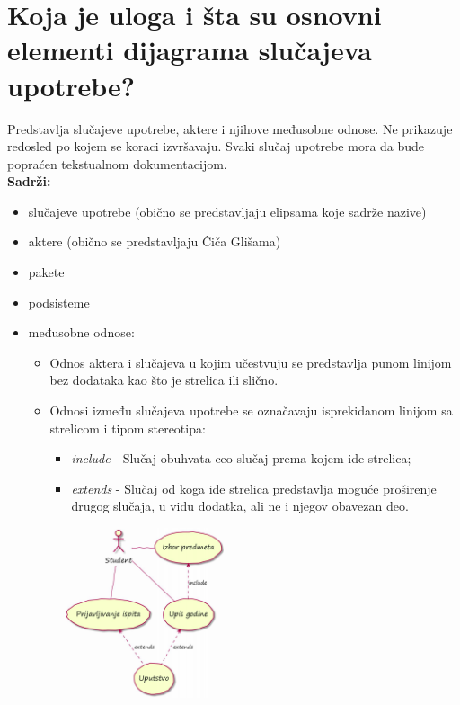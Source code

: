 \documentclass[a4paper]{article}
\begin{document}
\section{Koja je uloga i šta su osnovni elementi dijagrama slučajeva upotrebe?}
  Predstavlja slučajeve upotrebe, aktere i njihove međusobne odnose. Ne prikazuje redosled
  po kojem se koraci izvršavaju. Svaki slučaj upotrebe mora da bude popraćen tekstualnom
  dokumentacijom. \\
  \textbf{Sadrži:}
  \begin{itemize}
    \item slučajeve upotrebe (obično se predstavljaju elipsama koje sadrže nazive)
    \item aktere (obično se predstavljaju Čiča Glišama)
    \item pakete
    \item podsisteme
    \item međusobne odnose:
      \begin{itemize}
        \item Odnos aktera i slučajeva u kojim učestvuju se 
              predstavlja punom linijom bez dodataka kao što je 
              strelica ili slično.
        \item Odnosi između slučajeva upotrebe se označavaju isprekidanom
              linijom sa strelicom i tipom stereotipa:
              \begin{itemize}
                \item \textit{include} - Slučaj obuhvata ceo slučaj prema kojem
                      ide strelica;
                \item \textit{extends} - Slučaj od koga ide strelica predstavlja
                      moguće proširenje drugog slučaja, u vidu dodatka,
                      ali ne i njegov obavezan deo.
              \end{itemize}
      \end{itemize}
  \end{itemize} 
  \begin{figure}[H]
    \begin{center}
        \includegraphics[width=60mm,height=50mm]{Slike/slucaj_upotrebe_primer1.png}
    \end{center}
  \end{figure}
\end{document}
